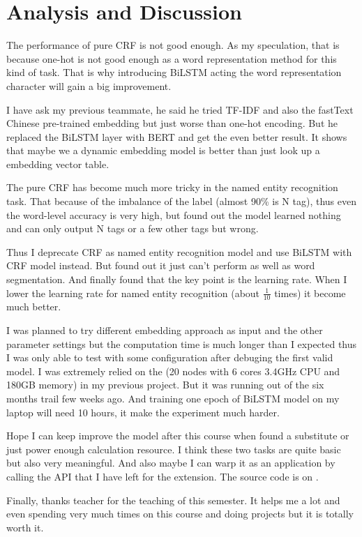 \section{Analysis and Discussion}
\label{sec:analysis}

The performance of pure CRF is not good enough. As my speculation, that is because one-hot is not good enough as a word representation method for this kind of task. That is why introducing BiLSTM acting the word representation character will gain a big improvement.

I have ask my previous teammate, he said he tried TF-IDF and also the fastText Chinese pre-trained embedding but just worse than one-hot encoding. But he replaced the BiLSTM layer with BERT and get the even better result. It shows that maybe we a dynamic embedding model is better than just look up a embedding vector table.

The pure CRF has become much more tricky in the named entity recognition task. That because of the imbalance of the label (almost 90\% is N tag), thus even the word-level accuracy is very high, but found out the model learned nothing and can only output N tags or a few other tags but wrong.

Thus I deprecate CRF as named entity recognition model and use BiLSTM with CRF model instead. But found out it just can't perform as well as word segmentation. And finally found that the key point is the learning rate. When I lower the learning rate for named entity recognition (about $\frac{1}{10}$ times) it become much better.

I was planned to try different embedding approach as input and the other parameter settings but the computation time is much longer than I expected thus I was only able to test with some configuration after debuging the first valid model. I was extremely relied on the  (20 nodes with 6 cores 3.4GHz CPU and 180GB memory) in my previous project. But it was running out of the six months trail few weeks ago. And training one epoch of BiLSTM model on my laptop will need 10 hours, it make the experiment much harder.

Hope I can keep improve the model after this course when found a substitute or just power enough calculation resource. I think these two tasks are quite basic but also very meaningful. And also maybe I can warp it as an application by calling the API that I have left for the extension. The source code is on .

Finally, thanks teacher for the teaching of this semester. It helps me a lot and even spending very much times on this course and doing projects but it is totally worth it.